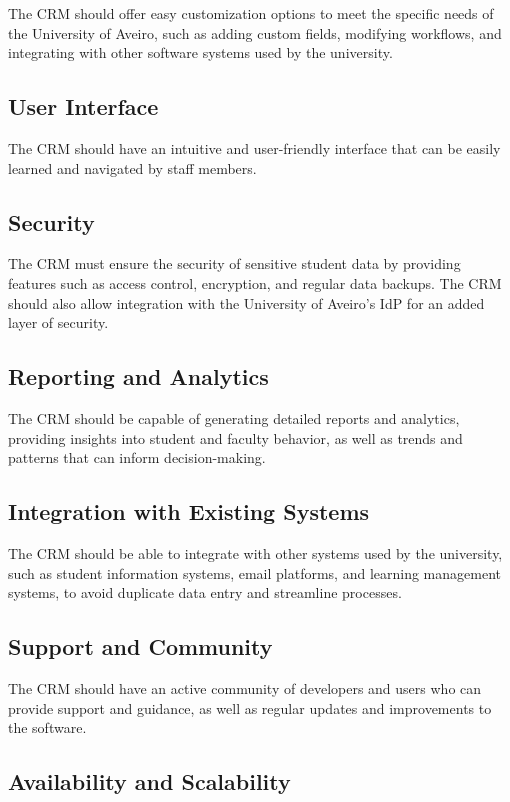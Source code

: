 \documentclass{article}
\begin{document}
The CRM should offer easy customization options to meet the specific needs of the University of Aveiro, such as adding custom fields, modifying workflows, and integrating with other software systems used by the university.

\subsection{User Interface}

The CRM should have an intuitive and user-friendly interface that can be easily learned and navigated by staff members.

\subsection{Security}

The CRM must ensure the security of sensitive student data by providing features such as access control, encryption, and regular data backups. The CRM should also allow integration with the University of Aveiro's IdP for an added layer of security.

\subsection{Reporting and Analytics}

The CRM should be capable of generating detailed reports and analytics, providing insights into student and faculty behavior, as well as trends and patterns that can inform decision-making.

\subsection{Integration with Existing Systems}

The CRM should be able to integrate with other systems used by the university, such as student information systems, email platforms, and learning management systems, to avoid duplicate data entry and streamline processes.

\subsection{Support and Community}

The CRM should have an active community of developers and users who can provide support and guidance, as well as regular updates and improvements to the software.

\subsection{Availability and Scalability}
\end{document}
